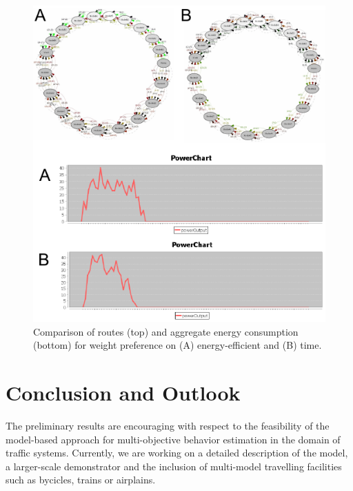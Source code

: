 \documentclass[conference]{../cls/IEEEtran}
\begin{document}
\begin{figure}[t!]
	\includegraphics[width=\columnwidth]{../gfx/results.pdf}
	\caption{Comparison of routes (top) and aggregate energy consumption
	(bottom) for weight preference  on (A) energy-efficient and (B) time.}
	\label{figure:results}
\end{figure}


\section{Conclusion and Outlook}

The preliminary results are encouraging with respect to the feasibility of the model-based approach for multi-objective behavior estimation in the domain of traffic systems.
Currently, we are working on a detailed description of the model, a larger-scale demonstrator and the inclusion of multi-model travelling facilities such as bycicles, trains or airplains.



\end{document}

